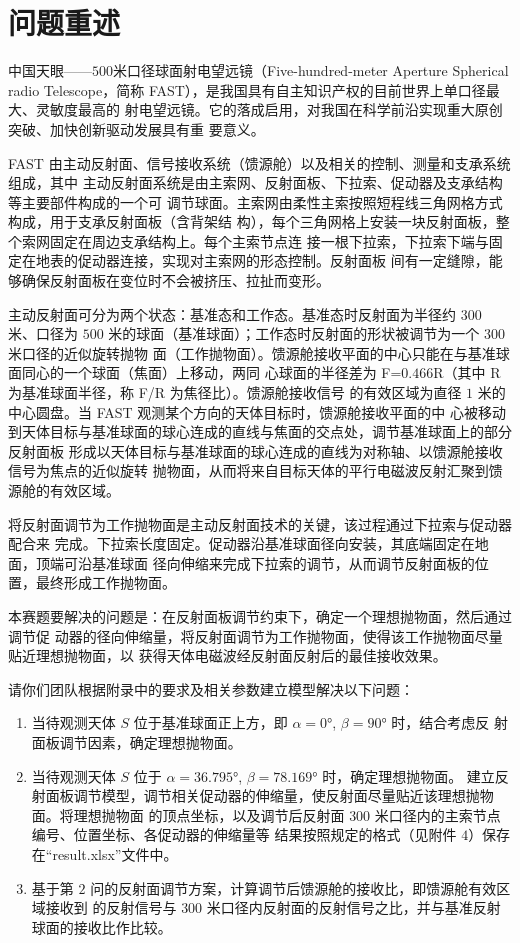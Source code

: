 \documentclass[withoutpreface,bwprint]{cumcmthesis} %
\begin{document}


\section{问题重述}
中国天眼——$500$米口径球面射电望远镜（Five-hundred-meter Aperture Spherical radio
Telescope，简称 FAST），是我国具有自主知识产权的目前世界上单口径最大、灵敏度最高的
射电望远镜。它的落成启用，对我国在科学前沿实现重大原创突破、加快创新驱动发展具有重
要意义。

FAST 由主动反射面、信号接收系统（馈源舱）以及相关的控制、测量和支承系统组成，其中
主动反射面系统是由主索网、反射面板、下拉索、促动器及支承结构等主要部件构成的一个可
调节球面。主索网由柔性主索按照短程线三角网格方式构成，用于支承反射面板（含背架结
构），每个三角网格上安装一块反射面板，整个索网固定在周边支承结构上。每个主索节点连
接一根下拉索，下拉索下端与固定在地表的促动器连接，实现对主索网的形态控制。反射面板
间有一定缝隙，能够确保反射面板在变位时不会被挤压、拉扯而变形。

主动反射面可分为两个状态：基准态和工作态。基准态时反射面为半径约 $300$ 米、口径为
$500$ 米的球面（基准球面）；工作态时反射面的形状被调节为一个 $300$ 米口径的近似旋转抛物
面（工作抛物面）。馈源舱接收平面的中心只能在与基准球面同心的一个球面（焦面）上移动，两同
心球面的半径差为 F=$0.466$R（其中 R 为基准球面半径，称 F/R 为焦径比）。馈源舱接收信号
的有效区域为直径 $1$ 米的中心圆盘。当 FAST 观测某个方向的天体目标时，馈源舱接收平面的中
心被移动到天体目标与基准球面的球心连成的直线与焦面的交点处，调节基准球面上的部分反射面板
形成以天体目标与基准球面的球心连成的直线为对称轴、以馈源舱接收信号为焦点的近似旋转
抛物面，从而将来自目标天体的平行电磁波反射汇聚到馈源舱的有效区域。

将反射面调节为工作抛物面是主动反射面技术的关键，该过程通过下拉索与促动器配合来
完成。下拉索长度固定。促动器沿基准球面径向安装，其底端固定在地面，顶端可沿基准球面
径向伸缩来完成下拉索的调节，从而调节反射面板的位置，最终形成工作抛物面。

本赛题要解决的问题是：在反射面板调节约束下，确定一个理想抛物面，然后通过调节促
动器的径向伸缩量，将反射面调节为工作抛物面，使得该工作抛物面尽量贴近理想抛物面，以
获得天体电磁波经反射面反射后的最佳接收效果。

请你们团队根据附录中的要求及相关参数建立模型解决以下问题：
\begin{enumerate}
    \item 当待观测天体 $𝑆$ 位于基准球面正上方，即 $\alpha = 0°$, $\beta = 90°$ 时，结合考虑反
          射面板调节因素，确定理想抛物面。
    \item 当待观测天体 $𝑆$ 位于 $\alpha = 36.795°$, $\beta = 78.169°$ 时，确定理想抛物面。
          建立反射面板调节模型，调节相关促动器的伸缩量，使反射面尽量贴近该理想抛物面。将理想抛物面
          的顶点坐标，以及调节后反射面 $300$ 米口径内的主索节点编号、位置坐标、各促动器的伸缩量等
          结果按照规定的格式（见附件 $4$）保存在“result.xlsx”文件中。
    \item 基于第 $2$ 问的反射面调节方案，计算调节后馈源舱的接收比，即馈源舱有效区域接收到
          的反射信号与 $300$ 米口径内反射面的反射信号之比，并与基准反射球面的接收比作比较。
\end{enumerate}
\end{document}
